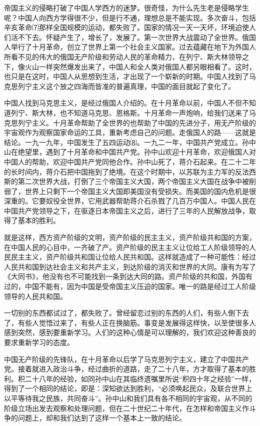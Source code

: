 \documentclass[UTF-8, a5paper, 12pt]{ctexart}
\begin{document}
帝国主义的侵略打破了中国人学西方的迷梦。很奇怪，为什么先生老是侵略学生呢？中国人向西方学得很不少，但是行不通，理想总是不能实现。多次奋斗，包括辛亥革命⑺那样全国规模的运动，都失败了。国家的情况一天一天坏，环境迫使人们活不下去。怀疑产生了，增长了，发展了。第一次世界大战震动了全世界。俄国人举行了十月革命，创立了世界上第一个社会主义国家。过去蕴藏在地下为外国人所看不见的伟大的俄国无产阶级和劳动人民的革命精力，在列宁、斯大林领导之下，像火山一样突然爆发出来了，中国人和全人类对俄国人都另眼相看了。这时，也只是在这时，中国人从思想到生活，才出现了一个崭新的时期。中国人找到了马克思列宁主义这个放之四海而皆准的普遍真理，中国的面目就起了变化了。

中国人找到马克思主义，是经过俄国人介绍的。在十月革命以前，中国人不但不知道列宁、斯大林，也不知道马克思、恩格斯。十月革命一声炮响，给我们送来了马克思列宁主义。十月革命帮助了全世界的也帮助了中国的先进分子，用无产阶级的宇宙观作为观察国家命运的工具，重新考虑自己的问题。走俄国人的路——这就是结论。一九一九年，中国发生了五四运动⑻。一九二一年，中国共产党成立。孙中山在绝望里，遇到了十月革命和中国共产党。孙中山欢迎十月革命，欢迎俄国人对中国人的帮助，欢迎中国共产党同他合作。孙中山死了，蒋介石起来。在二十二年的长时间内，蒋介石把中国拖到了绝境。在这个时期中，以苏联为主力军的反法西斯的第二次世界大战，打倒了三个帝国主义大国，两个帝国主义大国在战争中被削弱了，世界上只剩下一个帝国主义大国即美国没有受损失。而美国的国内危机是很深重的。它要奴役全世界，它用武器帮助蒋介石杀戮了几百万中国人。中国人民在中国共产党领导之下，在驱逐日本帝国主义之后，进行了三年的人民解放战争，取得了基本的胜利。

就是这样，西方资产阶级的文明，资产阶级的民主主义，资产阶级共和国的方案，在中国人民的心目中，一齐破了产。资产阶级的民主主义让位给工人阶级领导的人民民主主义，资产阶级共和国让位给人民共和国。这样就造成了一种可能性：经过人民共和国到达社会主义和共产主义，到达阶级的消灭和世界的大同。康有为写了《大同书》，他没有也不可能找到一条到达大同的路。资产阶级的共和国，外国有过的，中国不能有，因为中国是受帝国主义压迫的国家。唯一的路是经过工人阶级领导的人民共和国。

一切别的东西都试过了，都失败了。曾经留恋过别的东西的人们，有些人倒下去了，有些人觉悟过来了，有些人正在换脑筋。事变是发展得这样快，以至使很多人感到突然，感到要重新学习。人们的这种心情是可以理解的，我们欢迎这种善良的要求重新学习的态度。

中国无产阶级的先锋队，在十月革命以后学了马克思列宁主义，建立了中国共产党。接着就进入政治斗争，经过曲折的道路，走了二十八年，方才取得了基本的胜利。积二十八年的经验，如同孙中山在其临终遗嘱里所说“积四十年之经验”一样，得到了一个相同的结论，即是：深知欲达到胜利，“必须唤起民众，及联合世界上以平等待我之民族，共同奋斗”。孙中山和我们具有各不相同的宇宙观，从不同的阶级立场出发去观察和处理问题，但在二十世纪二十年代，在怎样和帝国主义作斗争的问题上，却和我们达到了这样一个基本上一致的结论。
\end{document}
